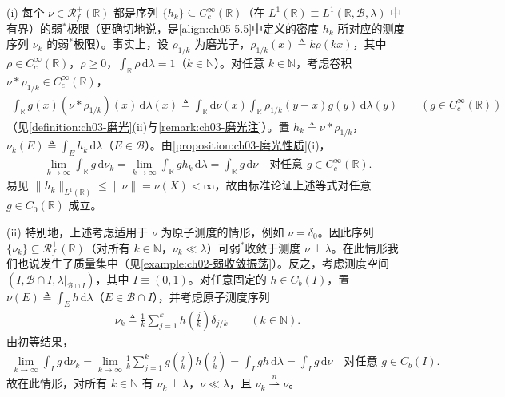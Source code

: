 \documentclass[../../main.tex]{subfiles}%
\begin{document}
\begin{example}\label{example:ch05-测度逼近}
\label{example:ch05-振荡集中}
(i) 每个 $\nu\in\mathscr{R}^+_f(\mathbb{R})$ 都是序列 $\{h_k\}\subseteq C^\infty_c(\mathbb{R})$（在 $L^1(\mathbb{R})\equiv L^1(\mathbb{R},\mathscr{B},\lambda)$ 中有界）的弱$^*$极限（更确切地说，是\eqref{align:ch05-5.5}中定义的密度 $h_k$ 所对应的测度序列 $\nu_k$ 的弱$^*$极限）。事实上，设 $\rho_{1/k}$ 为磨光子，$\rho_{1/k}(x)\triangleq k\rho(kx)$，其中 $\rho\in C^\infty_c(\mathbb{R})$，$\rho\geqslant0$，$\int_\mathbb{R}\rho\,\mathrm{d}\lambda=1$（$k\in\mathbb{N}$）。对任意 $k\in\mathbb{N}$，考虑卷积 $\nu*\rho_{1/k}\in C^\infty_c(\mathbb{R})$，
\begin{align*}
\int_\mathbb{R}g(x)(\nu*\rho_{1/k})(x)\,\mathrm{d}\lambda(x)
\triangleq \int_\mathbb{R}\mathrm{d}\nu(x)\int_\mathbb{R}\rho_{1/k}(y-x)g(y)\,\mathrm{d}\lambda(y)
\qquad(g\in C^\infty_c(\mathbb{R}))
\end{align*}
（见\cref{definition:ch03-磨光}(ii)与\cref{remark:ch03-磨光注}）。置 $h_k\triangleq \nu*\rho_{1/k}$，$\nu_k(E)\triangleq \int_E h_k\,\mathrm{d}\lambda$（$E\in\mathscr{B}$）。由\cref{proposition:ch03-磨光性质}(i)，
\begin{align*}
\lim_{k\to\infty}\int_\mathbb{R}g\,\mathrm{d}\nu_k
=\lim_{k\to\infty}\int_\mathbb{R}g h_k\,\mathrm{d}\lambda
=\int_\mathbb{R}g\,\mathrm{d}\nu
\quad\text{对任意 }g\in C^\infty_c(\mathbb{R}).
\end{align*}
易见 $\|h_k\|_{L^1(\mathbb{R})}\leqslant\|\nu\|=\nu(X)<\infty$，故由标准论证上述等式对任意 $g\in C_0(\mathbb{R})$ 成立。

(ii) 特别地，上述考虑适用于 $\nu$ 为原子测度的情形，例如 $\nu=\delta_0$。因此序列 $\{\nu_k\}\subseteq\mathscr{R}^+_f(\mathbb{R})$（对所有 $k\in\mathbb{N}$，$\nu_k\ll\lambda$）可弱$^*$收敛于测度 $\nu\perp\lambda$。在此情形我们也说发生了质量集中（见\cref{example:ch02-弱收敛振荡}）。反之，考虑测度空间 $(I,\mathscr{B}\cap I,\lambda|_{\mathscr{B}\cap I})$，其中 $I\equiv(0,1)$。对任意固定的 $h\in C_b(I)$，置 $\nu(E)\triangleq \int_E h\,\mathrm{d}\lambda$（$E\in\mathscr{B}\cap I$），并考虑原子测度序列
\begin{align*}
\nu_k\triangleq \frac{1}{k}\sum_{j=1}^k h\!\left(\frac{j}{k}\right)\delta_{j/k}\qquad(k\in\mathbb{N}).
\end{align*}
由初等结果，
\begin{align*}
\lim_{k\to\infty}\int_I g\,\mathrm{d}\nu_k
=\lim_{k\to\infty}\frac{1}{k}\sum_{j=1}^k g\!\left(\frac{j}{k}\right)h\!\left(\frac{j}{k}\right)
=\int_I gh\,\mathrm{d}\lambda=\int_I g\,\mathrm{d}\nu
\quad\text{对任意 }g\in C_b(I).
\end{align*}
故在此情形，对所有 $k\in\mathbb{N}$ 有 $\nu_k\perp\lambda$，$\nu\ll\lambda$，且 $\nu_k\stackrel{n}{\rightharpoonup}\nu$。
\end{example}
\end{document}
